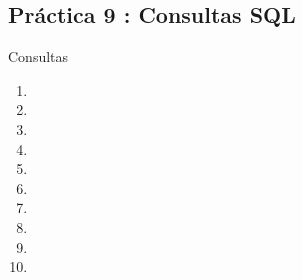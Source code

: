 \documentclass{report}
\begin{document}
	
	

	\begin{center}
		\section*{\LARGE{Práctica 9 : Consultas SQL}}
	\end{center}

    \begin{section}{Consultas}
    \begin{enumerate}
        \item 
        \item 
        \item 
        \item 
        \item 
        \item 
        \item 
        \item 
        \item 
        \item 
    \end{enumerate}
    \end{section}


  
\end{document}
